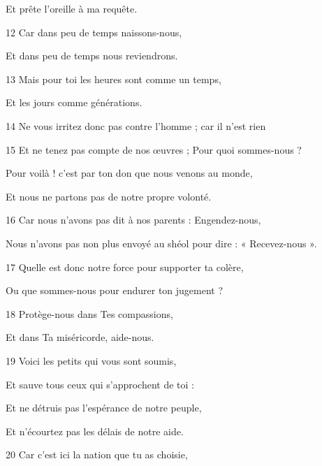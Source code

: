 \par Et prête l'oreille à ma requête.

\par 12 Car dans peu de temps naissons-nous,

\par Et dans peu de temps nous reviendrons.

\par 13 Mais pour toi les heures sont comme un temps,

\par Et les jours comme générations.

\par 14 Ne vous irritez donc pas contre l'homme ; car il n'est rien

\par 15 Et ne tenez pas compte de nos œuvres ; Pour quoi sommes-nous ?

\par Pour voilà ! c'est par ton don que nous venons au monde,

\par Et nous ne partons pas de notre propre volonté.

\par 16 Car nous n'avons pas dit à nos parents : Engendez-nous,

\par Nous n'avons pas non plus envoyé au shéol pour dire : « Recevez-nous ».

\par 17 Quelle est donc notre force pour supporter ta colère,

\par Ou que sommes-nous pour endurer ton jugement ?

\par 18 Protège-nous dans Tes compassions,

\par Et dans Ta miséricorde, aide-nous.

\par 19 Voici les petits qui vous sont soumis,

\par Et sauve tous ceux qui s'approchent de toi :

\par Et ne détruis pas l'espérance de notre peuple,

\par Et n'écourtez pas les délais de notre aide.

\par 20 Car c'est ici la nation que tu as choisie,

